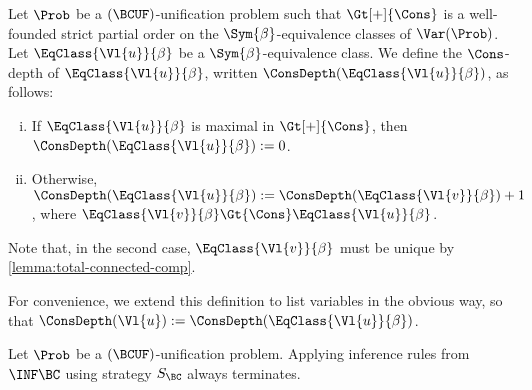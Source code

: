 \begin{Definition}
    Let $\Prob$ be a $(\BCUF)$-unification problem such that $\Gt[+]{\Cons}$ is
    a well-founded strict partial order on the $\Sym{\beta}$-equivalence
    classes of $\Var(\Prob)$. Let $\EqClass{\Vl{u}}{\beta}$ be a
    $\Sym{\beta}$-equivalence class. We define the $\Cons$-depth of
    $\EqClass{\Vl{u}}{\beta}$, written $\ConsDepth(\EqClass{\Vl{u}}{\beta})$, as
    follows:
    \begin{enumerate}[(i)]
        \item If $\EqClass{\Vl{u}}{\beta}$ is maximal in $\Gt[+]{\Cons}$, then
            $\ConsDepth(\EqClass{\Vl{u}}{\beta}) := 0$.
        \item Otherwise, $\ConsDepth(\EqClass{\Vl{u}}{\beta}) :=
            \ConsDepth(\EqClass{\Vl{v}}{\beta}) + 1$, where $\EqClass{\Vl{v}}{\beta}
            \Gt{\Cons} \EqClass{\Vl{u}}{\beta}$.
    \end{enumerate}
    Note that, in the second case, $\EqClass{\Vl{v}}{\beta}$ must be unique by
    \cref{lemma:total-connected-comp}.

    For convenience, we extend this definition to list variables in the obvious
    way, so that $\ConsDepth(\Vl{u}) := \ConsDepth(\EqClass{\Vl{u}}{\beta})$.
\end{Definition}

\begin{Theorem}\label{lemma:inf-bc-terminates}
    Let $\Prob$ be a $(\BCUF)$-unification problem. Applying inference rules
    from $\INF\BC$ using strategy $S_\BC$ always terminates.
\end{Theorem}

